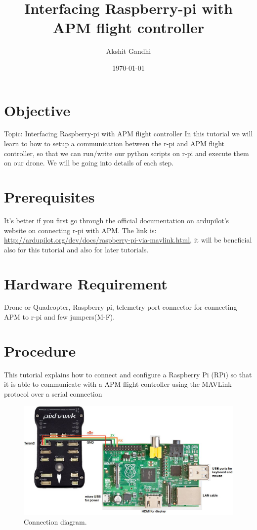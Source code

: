 \documentclass[11pt,a4paper]{article}
\title{Interfacing Raspberry-pi with APM flight controller}
\author{Akshit Gandhi}
\date{\today}
\begin{document}
	\maketitle
	\newpage
	\tableofcontents
	\newpage
	\section{Objective}
	Topic: Interfacing Raspberry-pi with APM flight controller
		In this tutorial we will learn to how to setup a communication between the r-pi and APM flight controller, so that we can run/write our python scripts on r-pi and execute them on our drone. We will be going into details of each step.
	\section{Prerequisites}
	 It's better if you first go through the official documentation on ardupilot's website on connecting r-pi with APM. The link is: \url{http://ardupilot.org/dev/docs/raspberry-pi-via-mavlink.html}, it will be beneficial also for this tutorial and also for later tutorials.
	\section{Hardware Requirement}
	 Drone or Quadcopter, Raspberry pi, telemetry port connector for connecting APM to r-pi and few jumpers(M-F).
	\section{Procedure}
	This tutorial explains how to connect and configure a Raspberry Pi (RPi) so that it is able to communicate with a APM flight controller using the MAVLink protocol over a serial connection
	 \begin{figure}[H]
	 	\centering
		\includegraphics[scale=0.35]{wiring}
	 	\caption{Connection diagram.}
\end{figure}
\end{document}
